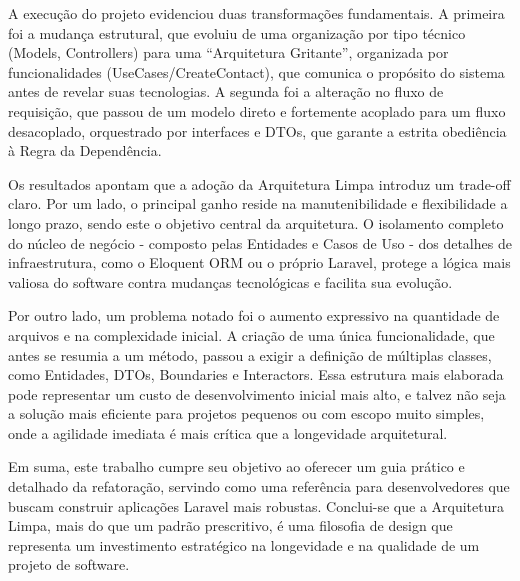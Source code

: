     \par A execução do projeto evidenciou duas transformações fundamentais. A primeira foi a mudança estrutural, que evoluiu de uma organização por tipo técnico (Models, Controllers) para uma ``Arquitetura Gritante'', organizada por funcionalidades (UseCases/CreateContact), que comunica o propósito do sistema antes de revelar suas tecnologias. A segunda foi a alteração no fluxo de requisição, que passou de um modelo direto e fortemente acoplado para um fluxo desacoplado, orquestrado por interfaces e DTOs, que garante a estrita obediência à Regra da Dependência.

    \par Os resultados apontam que a adoção da Arquitetura Limpa introduz um trade-off claro. Por um lado, o principal ganho reside na manutenibilidade e flexibilidade a longo prazo, sendo este o objetivo central da arquitetura. O isolamento completo do núcleo de negócio - composto pelas Entidades e Casos de Uso - dos detalhes de infraestrutura, como o Eloquent ORM ou o próprio Laravel, protege a lógica mais valiosa do software contra mudanças tecnológicas e facilita sua evolução. 
    
    \par Por outro lado, um problema notado foi o aumento expressivo na quantidade de arquivos e na complexidade inicial. A criação de uma única funcionalidade, que antes se resumia a um método, passou a exigir a definição de múltiplas classes, como Entidades, DTOs, Boundaries e Interactors. Essa estrutura mais elaborada pode representar um custo de desenvolvimento inicial mais alto, e talvez não seja a solução mais eficiente para projetos pequenos ou com escopo muito simples, onde a agilidade imediata é mais crítica que a longevidade arquitetural.

    \par Em suma, este trabalho cumpre seu objetivo ao oferecer um guia prático e detalhado da refatoração, servindo como uma referência para desenvolvedores que buscam construir aplicações Laravel mais robustas. Conclui-se que a Arquitetura Limpa, mais do que um padrão prescritivo, é uma filosofia de design que representa um investimento estratégico na longevidade e na qualidade de um projeto de software.